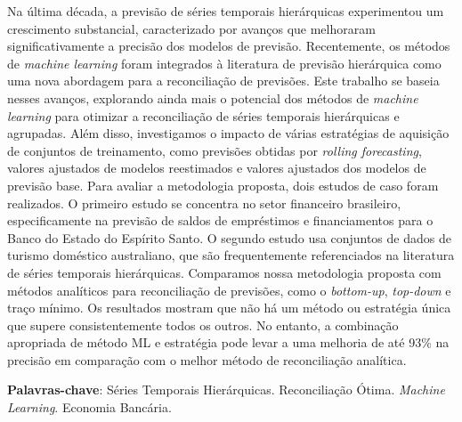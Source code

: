 
\setlength{\absparsep}{18pt}
\begin{resumo}
  Na última década, a previsão de séries temporais hierárquicas experimentou um crescimento substancial, caracterizado por avanços que melhoraram significativamente a precisão dos modelos de previsão. Recentemente, os métodos de \textit{machine learning} foram integrados à literatura de previsão hierárquica como uma nova abordagem para a reconciliação de previsões. Este trabalho se baseia nesses avanços, explorando ainda mais o potencial dos métodos de \textit{machine learning} para otimizar a reconciliação de séries temporais hierárquicas e agrupadas. Além disso, investigamos o impacto de várias estratégias de aquisição de conjuntos de treinamento, como previsões obtidas por \textit{rolling forecasting}, valores ajustados de modelos reestimados e valores ajustados dos modelos de previsão base. Para avaliar a metodologia proposta, dois estudos de caso foram realizados. O primeiro estudo se concentra no setor financeiro brasileiro, especificamente na previsão de saldos de empréstimos e financiamentos para o Banco do Estado do Espírito Santo. O segundo estudo usa conjuntos de dados de turismo doméstico australiano, que são frequentemente referenciados na literatura de séries temporais hierárquicas. Comparamos nossa metodologia proposta com métodos analíticos para reconciliação de previsões, como o \textit{bottom-up}, \textit{top-down} e traço mínimo. Os resultados mostram que não há um método ou estratégia única que supere consistentemente todos os outros. No entanto, a combinação apropriada de método ML e estratégia pode levar a uma melhoria de até 93\% na precisão em comparação com o melhor método de reconciliação analítica.

  \textbf{Palavras-chave}: Séries Temporais Hierárquicas. Reconciliação Ótima. \textit{Machine Learning}. Economia Bancária.
\end{resumo}

